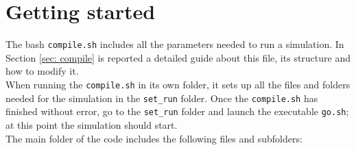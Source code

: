 \chapter{Getting started}
The bash \texttt{compile.sh} includes all the parameters needed to run a simulation. 
In Section \ref{sec: compile} is reported a detailed guide about this file, its structure and how to modify it.\\
When running the \texttt{compile.sh} in its own folder, it sets up all the files and folders needed for the simulation in the \texttt{set\_run} folder.
Once the \texttt{compile.sh} has finished without error, go to the \texttt{set\_run} folder and launch the executable \texttt{go.sh}; at this point the simulation should start.\\
The main folder of the code includes the following files and subfolders:
